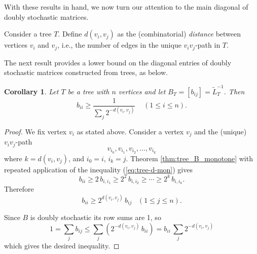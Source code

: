 \documentclass[12pt]{article}
\newtheorem{corollary}[theorem]{Corollary}
\begin{document}
With these results in hand, we now turn our attention to the main diagonal of doubly stochastic matrices.

Consider a tree $T$. Define $d(v_i,v_j)$ as the (combinatorial) {\em distance} between vertices $v_i$ and $v_j$, i.e., the number of edges in the unique $v_iv_j$-path in $T$.

The next result provides a lower bound on the diagonal entries of doubly stochastic matrices constructed from trees, as below.

\begin{corollary}
 \label{cor:tree_B_monotone}
  Let $T$ be a tree with $n$ vertices and let $B_T=[b_{ij}]=\tilde{L}_T^{-1}$.  Then 
  \begin{equation}
   \label{eq:diag-L-ds}
     b_{ii} \ge \frac{1}{\sum_j 2^{-d(v_i,v_j)}}   \;\;\;\;(1\le i\le n). 
   \end{equation}
\end{corollary}
%
\begin{proof}
 We fix vertex $v_i$ as stated above. Consider a vertex $v_j$ and the (unique) $v_iv_j$-path
 \[
    v_{i_0}, v_{i_1}, v_{i_2}, \ldots, v_{i_k}
 \]
 where $k=d(v_i,v_j)$, and $i_0=i$, $i_k=j$. 
 Theorem \ref{thm:tree_B_monotone} with repeated application of the inequality (\ref{eq:tree-d-mon}) gives
 \[
      b_{ii} \ge 2 \,b_{i,i_1} \ge 2^2 \,b_{i,i_2} \ge \cdots \ge 2^k \,b_{i,i_k} .
 \]     
 Therefore 
 \[
    b_{ii} \ge 2^{d(v_i,v_j)} \,b_{ij} \;\;\;(1 \le j \le n).
 \]
   
 Since $B$ is doubly stochastic its row sums are 1, so
 \[
   1 = \sum_{j} b_{ij} \le \sum_j (2^{-d(v_i,v_j)}\, b_{ii})=b_{ii} \,\sum_j 2^{-d(v_i,v_j)}
 \]
 which gives the desired inequality.
\end{proof}
\medskip
\end{document}
